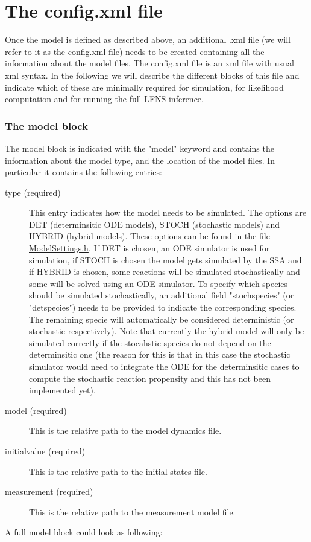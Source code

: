 \documentclass[11pt]{article} %
\begin{document}
\part{The config.xml file}
Once the model is defined as described above, an additional  .xml file (we will refer to it as the config.xml file) needs to be created containing all the information about the model files. The config.xml file is an xml file with usual xml syntax. In the following we will describe the different blocks of this file and indicate which of these are minimally required for simulation, for likelihood computation and for running the full LFNS-inference. 

\section{The model block}
The model block is indicated with the "model" keyword and contains the information about the model type, and the location of the model files. In particular it contains the following entries: 
\begin{description}
\item[type (required)] This entry indicates how the model needs to be simulated. The options are DET (determinsitic ODE models), STOCH (stochastic models) and HYBRID (hybrid models). These options can be found in the file \href{https://github.com/Mijan/LFNS/blob/publishable/src/models/ModelSettings.h}{ModelSettings.h}. If DET is chosen, an ODE simulator is used for simulation, if STOCH is chosen the model gets simulated by the SSA and if HYBRID is chosen, some reactions will be simulated stochastically and some will be solved using an ODE simulator. To specify which species should be simulated stochastically, an additional field "stochspecies" (or "detspecies") needs to be provided to indicate the corresponding species. The remaining specie will automatically be considered deterministic (or stochastic respectively). Note that currently the hybrid model will only be simulated correctly if the stocahstic species do not depend on the determinsitic one (the reason for this is that in this case the stochastic simulator would need to integrate the ODE for the determinsitic cases to compute the stochastic reaction propensity and this has not been implemented yet). 
\item[model (required)] This is the relative path to the model dynamics file. 
\item[initialvalue (required)]This is the relative path to the initial states file.
\item[measurement (required)] This is the relative path to the measurement model file. 
\end{description}
A full model block could look as following:
\end{document}
